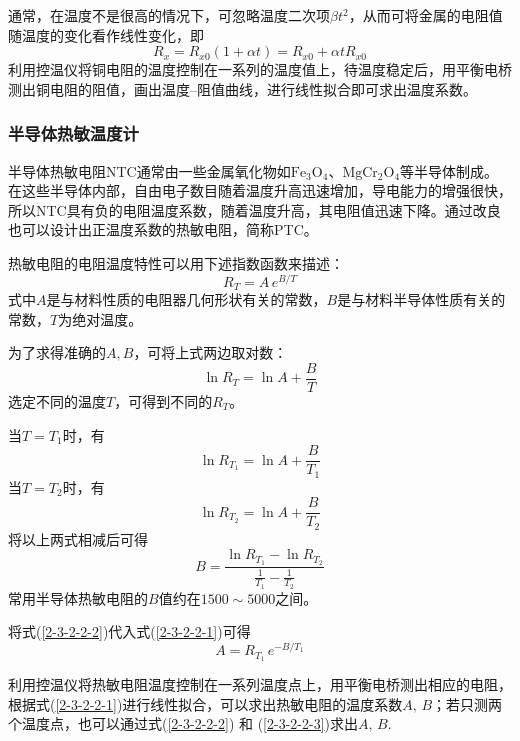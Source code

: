 \documentclass[UTF8]{article}
\theoremstyle{MyLineTheoremStyle} %
\theoremstyle{MyBlockTheoremStyle} %
\theoremstyle{MySubsubsectionStyle} %
\begin{document}
通常，在温度不是很高的情况下，可忽略温度二次项$ \beta t^2 $，从而可将金属的电阻值随温度的变化看作线性变化，即
\begin{equation}
R_x=R_{x0}(1+\alpha t)=R_{x0}+\alpha tR_{x0}
\end{equation}
利用控温仪将铜电阻的温度控制在一系列的温度值上，待温度稳定后，用平衡电桥测出铜电阻的阻值，画出温度--阻值曲线，进行线性拟合即可求出温度系数。

\subsubsection{半导体热敏温度计}
半导体热敏电阻NTC通常由一些金属氧化物如$ \mathrm{Fe_3O_4} $、$ \mathrm{MgCr_2O_4} $等半导体制成。在这些半导体内部，自由电子数目随着温度升高迅速增加，导电能力的增强很快，所以NTC具有负的电阻温度系数，随着温度升高，其电阻值迅速下降。通过改良也可以设计出正温度系数的热敏电阻，简称PTC。

热敏电阻的电阻温度特性可以用下述指数函数来描述：
\begin{equation}
R_T=A\,e^{B/T}
\end{equation}
式中$ A $是与材料性质的电阻器几何形状有关的常数，$ B $是与材料半导体性质有关的常数，$ T $为绝对温度。

为了求得准确的$ A,B $，可将上式两边取对数：
\begin{equation}\label{2-3-2-2-1}
    \ln R_T=\ln A+\frac BT
\end{equation}
选定不同的温度$ T $，可得到不同的$ R_T $。

当$ T=T_1 $时，有
\begin{equation}
\ln R_{T_1}=\ln A+\frac{B}{T_1}
\end{equation}
当$ T=T_2 $时，有
\begin{equation}
\ln R_{T_2}=\ln A+\frac{B}{T_2}
\end{equation}
将以上两式相减后可得
\begin{equation}\label{2-3-2-2-2}
    B=\frac{\ln R_{T_1}-\ln R_{T_2}}{\frac{1}{T_1}-\frac{1}{T_2}}
\end{equation}
常用半导体热敏电阻的$ B $值约在$ 1500\sim 5000 $之间。

将式(\ref{2-3-2-2-2})代入式(\ref{2-3-2-2-1})可得
\begin{equation}\label{2-3-2-2-3}
    A=R_{T_1}\,e^{-B/T_1}
\end{equation}

利用控温仪将热敏电阻温度控制在一系列温度点上，用平衡电桥测出相应的电阻，根据式(\ref{2-3-2-2-1})进行线性拟合，可以求出热敏电阻的温度系数$ A,\,B $；若只测两个温度点，也可以通过式(\ref{2-3-2-2-2}) 和 (\ref{2-3-2-2-3})求出$ A,\,B $.
\end{document}
